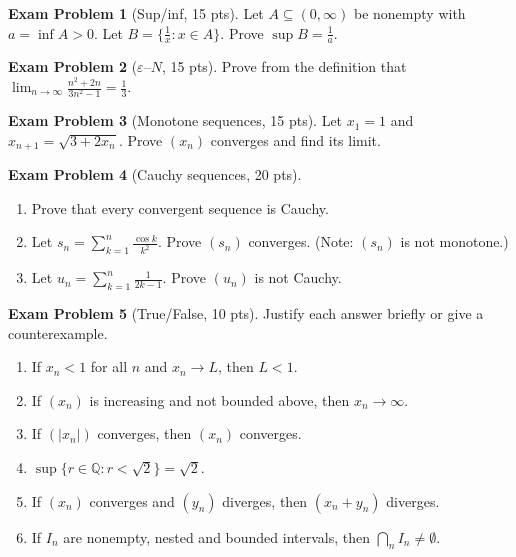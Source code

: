 \documentclass[11pt]{article}
\theoremstyle{definition}
\newtheorem{mprob}{Exam Problem}
\newcommand{\Q}{\mathbb{Q}}
\newcommand{\eps}{\varepsilon}
\begin{document}
\begin{mprob}[Sup/inf, 15 pts]\label{mock:recip}
Let $A\subseteq(0,\infty)$ be nonempty with $a=\inf A>0$. Let
$B=\{\frac1x:x\in A\}$. Prove $\sup B=\frac1a$.
\end{mprob}

\begin{mprob}[$\eps$--$N$, 15 pts]
Prove from the definition that
$\displaystyle\lim_{n\to\infty}\frac{n^2+2n}{3n^2-1}=\frac13$.
\end{mprob}

\begin{mprob}[Monotone sequences, 15 pts]
Let $x_1=1$ and $x_{n+1}=\sqrt{3+2x_n}$. Prove $(x_n)$ converges and find
its limit.
\end{mprob}

\begin{mprob}[Cauchy sequences, 20 pts]\label{mock:cauchy}
\leavevmode
\begin{enumerate}[label=(\alph*),nosep]
  \item Prove that every convergent sequence is Cauchy.
  \item Let $s_n=\sum_{k=1}^n\frac{\cos k}{k^2}$. Prove $(s_n)$ converges.
        (Note: $(s_n)$ is not monotone.)
  \item Let $u_n=\sum_{k=1}^n\frac1{2k-1}$. Prove $(u_n)$ is not Cauchy.
\end{enumerate}
\end{mprob}

\begin{mprob}[True/False, 10 pts]
Justify each answer briefly or give a counterexample.
\begin{enumerate}[label=(\alph*),nosep]
  \item If $x_n<1$ for all $n$ and $x_n\to L$, then $L<1$.
  \item If $(x_n)$ is increasing and not bounded above, then $x_n\to\infty$.
  \item If $(|x_n|)$ converges, then $(x_n)$ converges.
  \item $\sup\{r\in\Q:r<\sqrt2\}=\sqrt2$.
  \item If $(x_n)$ converges and $(y_n)$ diverges, then $(x_n+y_n)$
        diverges.
  \item If $I_n$ are nonempty, nested and bounded intervals, then
        $\bigcap_nI_n\ne\emptyset$.
\end{enumerate}
\end{mprob}

\newpage
\end{document}
